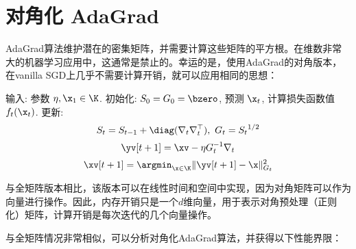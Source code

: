 \section{
    对角化 AdaGrad
    } 


AdaGrad算法维护潜在的密集矩阵，并需要计算这些矩阵的平方根。在维数非常大的机器学习应用中，这通常是禁止的。幸运的是，使用AdaGrad的对角版本，在vanilla SGD上几乎不需要计算开销，就可以应用相同的思想：
\begin{algorithm}
	[H] \caption{
        AdaGrad （对角矩阵化版本）
        } \label{alg:diag-adagrad}
	\begin{algorithmic}
		[1] 
        \STATE 输入: 参数 $\eta, \x_1 \in \K$.
		\STATE 初始化: $S_0 = G_0 = \bzero $, 
		\STATE 预测 $\x_t$, 计算损失函数值 $f_t(\x_t)$.
		\STATE 更新: 
		$$S_t = S_{t-1} + \diag(\nabla_t \nabla_t^\top), \ G_t = {S_t}^{1/2}$$
		$$ \yv[t+1] = \xv - \eta G_t^{-1} \nabla_t $$ 
		$$ \xv[t+1] = \argmin_{\x \in \K} \| \yv[t+1]  - \x\|^2_{G_t} $$ 
				\ENDFOR
	\end{algorithmic}
\end{algorithm}

与全矩阵版本相比，该版本可以在线性时间和空间中实现，因为对角矩阵可以作为向量进行操作。因此，内存开销只是一个$d$维向量，用于表示对角预处理（正则化）矩阵，计算开销是每次迭代的几个向量操作。

与全矩阵情况非常相似，可以分析对角化AdaGrad算法，并获得以下性能界限：

